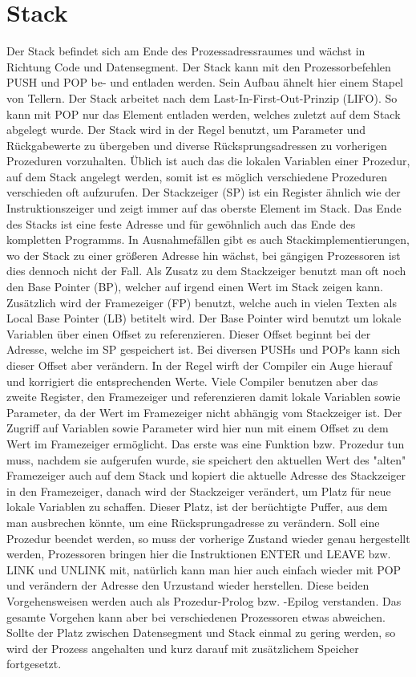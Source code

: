 \documentclass[12pt]{book}
\begin{document}
\section{Stack}
Der Stack befindet sich am Ende des Prozessadressraumes und wächst in Richtung
Code und Datensegment. Der Stack kann mit den Prozessorbefehlen PUSH und POP be-
und entladen werden. Sein Aufbau ähnelt hier einem Stapel von Tellern. Der Stack
arbeitet nach dem Last-In-First-Out-Prinzip (LIFO). So kann mit POP nur das
Element entladen werden, welches zuletzt auf dem Stack abgelegt wurde. Der Stack
wird in der Regel benutzt, um Parameter und Rückgabewerte zu übergeben und
diverse Rücksprungsadressen zu vorherigen Prozeduren vorzuhalten. Üblich ist
auch das die lokalen Variablen einer Prozedur, auf dem Stack angelegt werden,
somit ist es möglich verschiedene Prozeduren verschieden oft aufzurufen. Der
Stackzeiger (SP) ist ein Register ähnlich wie der Instruktionszeiger und zeigt
immer auf das oberste Element im Stack. Das Ende des Stacks ist eine feste
Adresse und für gewöhnlich auch das Ende des kompletten Programms. In
Ausnahmefällen gibt es auch Stackimplementierungen, wo der Stack zu einer
größeren Adresse hin wächst, bei gängigen Prozessoren ist dies dennoch nicht der
Fall. Als Zusatz zu dem Stackzeiger benutzt man oft noch den Base Pointer (BP),
welcher auf irgend einen Wert im Stack zeigen kann. Zusätzlich wird der
Framezeiger (FP) benutzt, welche auch in vielen Texten als Local Base Pointer
(LB) betitelt wird. Der Base Pointer wird benutzt um lokale Variablen über einen
Offset zu referenzieren. Dieser Offset beginnt bei der Adresse, welche im SP
gespeichert ist. Bei diversen PUSHs und POPs kann sich dieser Offset aber
verändern. In der Regel wirft der Compiler ein Auge hierauf und korrigiert die
entsprechenden Werte. Viele Compiler benutzen aber das zweite Register, den
Framezeiger und referenzieren damit lokale Variablen sowie Parameter, da der
Wert im Framezeiger nicht abhängig vom Stackzeiger ist. Der Zugriff auf
Variablen sowie Parameter wird hier nun mit einem Offset zu dem Wert im
Framezeiger ermöglicht. Das erste was eine Funktion bzw. Prozedur tun muss,
nachdem sie aufgerufen wurde, sie speichert den aktuellen Wert des "alten"
Framezeiger auch auf dem Stack und kopiert die aktuelle Adresse des Stackzeiger
in den Framezeiger, danach wird der Stackzeiger verändert, um Platz für neue
lokale Variablen zu schaffen. Dieser Platz, ist der berüchtigte Puffer, aus dem
man ausbrechen könnte, um eine Rücksprungadresse zu verändern. Soll eine
Prozedur beendet werden, so muss der vorherige Zustand wieder genau hergestellt
werden, Prozessoren bringen hier die Instruktionen ENTER und LEAVE bzw. LINK und
UNLINK mit, natürlich kann man hier auch einfach wieder mit POP und verändern
der Adresse den Urzustand wieder herstellen. Diese beiden Vorgehensweisen werden
auch als Prozedur-Prolog bzw. -Epilog verstanden. Das gesamte Vorgehen kann aber
bei verschiedenen Prozessoren etwas abweichen. Sollte der Platz zwischen
Datensegment und Stack einmal zu gering werden, so wird der Prozess angehalten
und kurz darauf mit zusätzlichem Speicher fortgesetzt.
\end{document}
